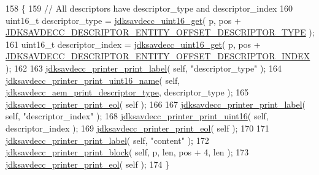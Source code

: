 \begin{DoxyCode}
158 \{
159     \textcolor{comment}{// All descriptors have descriptor\_type and descriptor\_index}
160     uint16\_t descriptor\_type = \hyperlink{group__endian_ga3fbbbc20be954aa61e039872965b0dc9}{jdksavdecc\_uint16\_get}( p, pos + 
      \hyperlink{group__descriptor__entity_ga834412c490d248e344135ca60eac5868}{JDKSAVDECC\_DESCRIPTOR\_ENTITY\_OFFSET\_DESCRIPTOR\_TYPE} );
161     uint16\_t descriptor\_index = \hyperlink{group__endian_ga3fbbbc20be954aa61e039872965b0dc9}{jdksavdecc\_uint16\_get}( p, pos + 
      \hyperlink{group__descriptor__entity_ga837cc2f5923e215364bf2b5a722af046}{JDKSAVDECC\_DESCRIPTOR\_ENTITY\_OFFSET\_DESCRIPTOR\_INDEX} );
162 
163     \hyperlink{group__util_gaf7818b24143b3c7502926a425a242ff5}{jdksavdecc\_printer\_print\_label}( \textcolor{keyword}{self}, \textcolor{stringliteral}{"descriptor\_type"} );
164     \hyperlink{group__util_ga62486d864a66773d19bbbe23cebf346a}{jdksavdecc\_printer\_print\_uint16\_name}( \textcolor{keyword}{self}, 
      \hyperlink{group__aem__print_gabb4f27bdad61aeaf875d91f408b7199d}{jdksavdecc\_aem\_print\_descriptor\_type}, descriptor\_type );
165     \hyperlink{group__util_gacda56c9d3d24593a52c999682fa6e6e3}{jdksavdecc\_printer\_print\_eol}( \textcolor{keyword}{self} );
166 
167     \hyperlink{group__util_gaf7818b24143b3c7502926a425a242ff5}{jdksavdecc\_printer\_print\_label}( \textcolor{keyword}{self}, \textcolor{stringliteral}{"descriptor\_index"} );
168     \hyperlink{group__util_ga9793e0ff8e7ed25d957282ee6b257ce2}{jdksavdecc\_printer\_print\_uint16}( \textcolor{keyword}{self}, descriptor\_index );
169     \hyperlink{group__util_gacda56c9d3d24593a52c999682fa6e6e3}{jdksavdecc\_printer\_print\_eol}( \textcolor{keyword}{self} );
170 
171     \hyperlink{group__util_gaf7818b24143b3c7502926a425a242ff5}{jdksavdecc\_printer\_print\_label}( \textcolor{keyword}{self}, \textcolor{stringliteral}{"content"} );
172     \hyperlink{group__util_ga18d7b11e396f21996dedde77febcb22f}{jdksavdecc\_printer\_print\_block}( \textcolor{keyword}{self}, p, len, pos + 4, len );
173     \hyperlink{group__util_gacda56c9d3d24593a52c999682fa6e6e3}{jdksavdecc\_printer\_print\_eol}( \textcolor{keyword}{self} );
174 \}
\end{DoxyCode}



